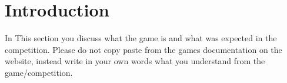 \section{Introduction}

In This section you discuss what the game is and what was expected in the competition. Please do not copy paste from the games documentation on the website, instead write in your own words what you understand from the game/competition.
